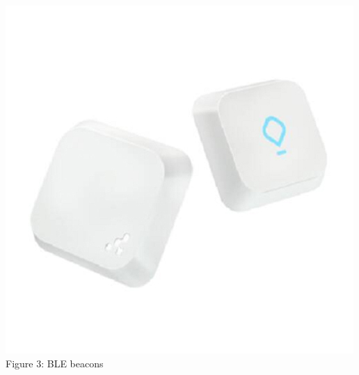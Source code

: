 \documentclass{article}
\begin{document}
\begin{center}
\includegraphics[scale=0.35]{beacon1}
\\Figure 3: BLE beacons
\end{center}
\pagebreak
\end{document}
